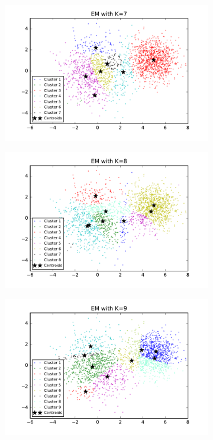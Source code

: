 \begin{description}
\begin{description}
\begin{figure}[!h]
\begin{subfigure}[b]{0.475\textwidth}
            \includegraphics[width=\textwidth]{./figures/clustering_EM_7.pdf}
        \end{subfigure}
        \hfill
        \begin{subfigure}[b]{0.475\textwidth}  
            \centering 
            \includegraphics[width=\textwidth]{./figures/clustering_EM_8.pdf}
        \end{subfigure}
        \begin{subfigure}[b]{0.475\textwidth}   
            \centering 
            \includegraphics[width=\textwidth]{./figures/clustering_EM_9.pdf}

\end{subfigure}
\end{figure}
\end{description}
\end{description}

